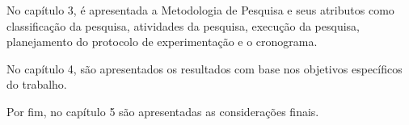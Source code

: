 No capítulo 3, é apresentada a Metodologia de Pesquisa e seus atributos como classificação da pesquisa, atividades da pesquisa, execução da pesquisa, planejamento do protocolo de experimentação e o cronograma.

No capítulo 4, são apresentados os resultados com base nos objetivos específicos do trabalho.

Por fim, no capítulo 5 são apresentadas as considerações finais.
